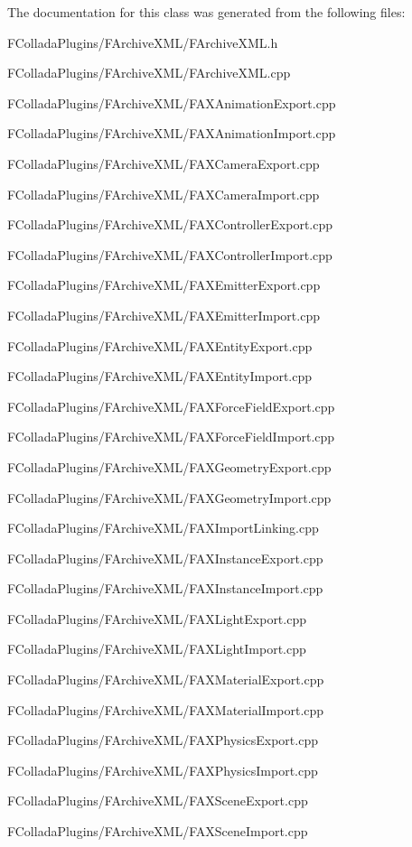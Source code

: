 The documentation for this class was generated from the following files:\begin{DoxyCompactItemize}
\item 
FColladaPlugins/FArchiveXML/FArchiveXML.h\item 
FColladaPlugins/FArchiveXML/FArchiveXML.cpp\item 
FColladaPlugins/FArchiveXML/FAXAnimationExport.cpp\item 
FColladaPlugins/FArchiveXML/FAXAnimationImport.cpp\item 
FColladaPlugins/FArchiveXML/FAXCameraExport.cpp\item 
FColladaPlugins/FArchiveXML/FAXCameraImport.cpp\item 
FColladaPlugins/FArchiveXML/FAXControllerExport.cpp\item 
FColladaPlugins/FArchiveXML/FAXControllerImport.cpp\item 
FColladaPlugins/FArchiveXML/FAXEmitterExport.cpp\item 
FColladaPlugins/FArchiveXML/FAXEmitterImport.cpp\item 
FColladaPlugins/FArchiveXML/FAXEntityExport.cpp\item 
FColladaPlugins/FArchiveXML/FAXEntityImport.cpp\item 
FColladaPlugins/FArchiveXML/FAXForceFieldExport.cpp\item 
FColladaPlugins/FArchiveXML/FAXForceFieldImport.cpp\item 
FColladaPlugins/FArchiveXML/FAXGeometryExport.cpp\item 
FColladaPlugins/FArchiveXML/FAXGeometryImport.cpp\item 
FColladaPlugins/FArchiveXML/FAXImportLinking.cpp\item 
FColladaPlugins/FArchiveXML/FAXInstanceExport.cpp\item 
FColladaPlugins/FArchiveXML/FAXInstanceImport.cpp\item 
FColladaPlugins/FArchiveXML/FAXLightExport.cpp\item 
FColladaPlugins/FArchiveXML/FAXLightImport.cpp\item 
FColladaPlugins/FArchiveXML/FAXMaterialExport.cpp\item 
FColladaPlugins/FArchiveXML/FAXMaterialImport.cpp\item 
FColladaPlugins/FArchiveXML/FAXPhysicsExport.cpp\item 
FColladaPlugins/FArchiveXML/FAXPhysicsImport.cpp\item 
FColladaPlugins/FArchiveXML/FAXSceneExport.cpp\item 
FColladaPlugins/FArchiveXML/FAXSceneImport.cpp\end{DoxyCompactItemize}
